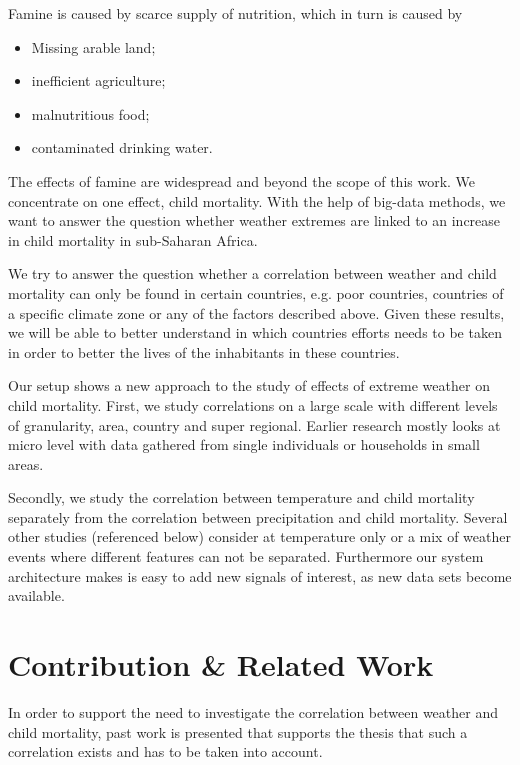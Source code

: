 \documentclass[
10pt, %
a4paper, %
oneside, %
headinclude,footinclude, %
useAMS,
usenatbib
]{mn2e}  %
\begin{document}
Famine is caused by scarce supply of nutrition, which in turn is caused by
\begin{itemize}
    \item Missing arable land;
    \item inefficient agriculture;
    \item malnutritious food;
    \item contaminated drinking water.
\end{itemize}

The effects of famine are widespread and beyond the scope of this work. We concentrate on one effect, child mortality. With the help of big-data methods, we want to answer the question whether weather extremes are linked to an increase in child mortality in sub-Saharan Africa.

We try to answer the question whether a correlation between weather and child mortality can only be found in certain countries, e.g. poor countries, countries of a specific climate zone or any of the factors described above. Given these results, we will be able to better understand in which countries efforts needs to be taken in order to better the lives of the inhabitants in these countries.

Our setup shows a new approach to the study of effects of extreme weather on child mortality. First, we study correlations on a large scale with different levels of granularity, area, country and super regional. Earlier research mostly looks at micro level with data gathered from single individuals or households in small areas.

Secondly, we study the correlation between temperature and child mortality separately from the correlation between precipitation and child mortality. Several other studies (referenced below) consider at temperature only or a mix of weather events where different features can not be separated. Furthermore our system architecture makes is easy to add new signals of interest, as new data sets become available.

\section{Contribution \& Related Work}
In order to support the need to investigate the correlation between weather and child mortality, past work is presented that supports the thesis that such a correlation exists and has to be taken into account.
\end{document}
